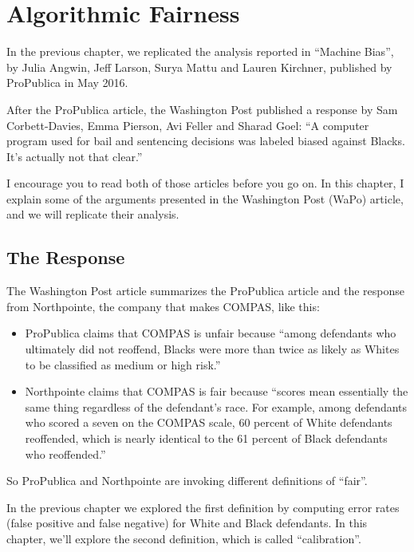 \chapter{Algorithmic Fairness}\label{algorithmic-fairness}

In the previous chapter, we replicated the analysis reported in
``Machine Bias'', by Julia Angwin, Jeff Larson, Surya Mattu and Lauren
Kirchner, published by ProPublica in May 2016.

After the ProPublica article, the Washington Post published a response
by Sam Corbett-Davies, Emma Pierson, Avi Feller and Sharad Goel: ``A
computer program used for bail and sentencing decisions was labeled
biased against Blacks. It's actually not that clear.''

I encourage you to read both of those articles before you go on. In this
chapter, I explain some of the arguments presented in the Washington
Post (WaPo) article, and we will replicate their analysis.

\section{The Response}\label{the-response}

The Washington Post article summarizes the ProPublica article and the
response from Northpointe, the company that makes COMPAS, like this:

\begin{itemize}
\item
  ProPublica claims that COMPAS is unfair because ``among defendants who
  ultimately did not reoffend, Blacks were more than twice as likely as
  Whites to be classified as medium or high risk.''
\item
  Northpointe claims that COMPAS is fair because ``scores mean
  essentially the same thing regardless of the defendant's race. For
  example, among defendants who scored a seven on the COMPAS scale, 60
  percent of White defendants reoffended, which is nearly identical to
  the 61 percent of Black defendants who reoffended.''
\end{itemize}

So ProPublica and Northpointe are invoking different definitions of
``fair''.

In the previous chapter we explored the first definition by computing
error rates (false positive and false negative) for White and Black
defendants. In this chapter, we'll explore the second definition, which
is called ``calibration''.

